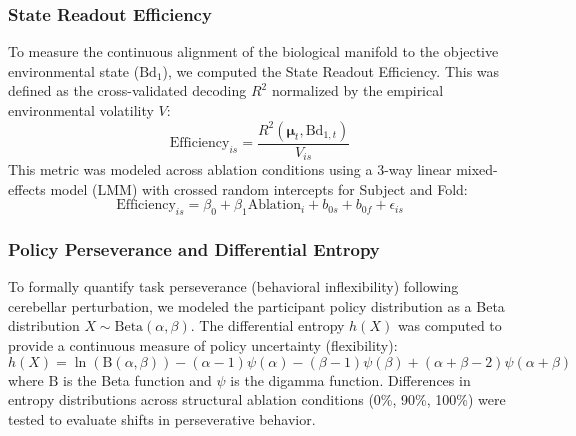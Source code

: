 \documentclass[12pt, a4paper]{extarticle}
\begin{document}
	\subsubsection{State Readout Efficiency}
	To measure the continuous alignment of the biological manifold to the objective environmental state ($\mathrm{Bd}_1$), we computed the State Readout Efficiency. This was defined as the cross-validated decoding $R^2$ normalized by the empirical environmental volatility $V$:
	\begin{equation}
		\text{Efficiency}_{is} = \frac{R^2(\boldsymbol{\mu}_t, \mathrm{Bd}_{1, t})}{V_{is}}
	\end{equation}
	This metric was modeled across ablation conditions using a 3-way linear mixed-effects model (LMM) with crossed random intercepts for Subject and Fold:
	\begin{equation}
		\text{Efficiency}_{is} = \beta_0 + \beta_1 \mathrm{Ablation}_i + b_{0s} + b_{0f} + \epsilon_{is}
	\end{equation}
	
	\subsubsection{Policy Perseverance and Differential Entropy}
	To formally quantify task perseverance (behavioral inflexibility) following cerebellar perturbation, we modeled the participant policy distribution as a Beta distribution $X \sim \text{Beta}(\alpha, \beta)$. The differential entropy $h(X)$ was computed to provide a continuous measure of policy uncertainty (flexibility):
	\begin{equation}
		h(X) = \ln(\mathrm{B}(\alpha, \beta)) - (\alpha - 1)\psi(\alpha) - (\beta - 1)\psi(\beta) + (\alpha + \beta - 2)\psi(\alpha + \beta)
	\end{equation}
	where $\mathrm{B}$ is the Beta function and $\psi$ is the digamma function. Differences in entropy distributions across structural ablation conditions (0\%, 90\%, 100\%) were tested to evaluate shifts in perseverative behavior.
	
\end{document}
